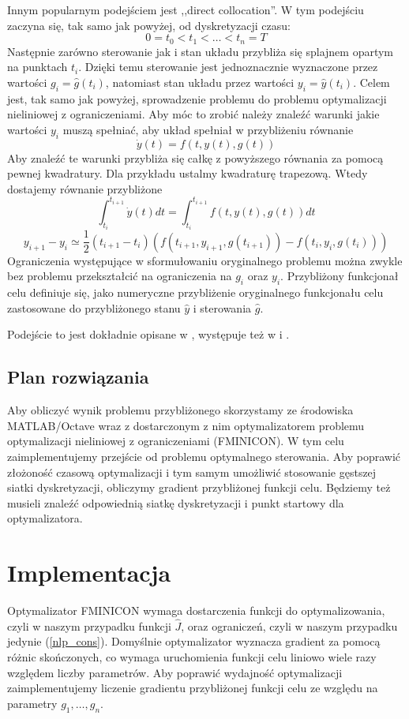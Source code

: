 \documentclass[11pt]{article}
\begin{document}
Innym popularnym podejściem jest ,,direct collocation''. W tym podejściu zaczyna się, tak samo jak powyżej, od dyskretyzacji czasu:
\[0 = t_0 < t_1 < \ldots < t_n = T\]
Następnie zarówno sterowanie jak i stan układu przybliża się splajnem opartym na punktach $t_i$. Dzięki temu sterowanie jest jednoznacznie wyznaczone przez wartości $g_i = \hat{g}(t_i)$, natomiast stan układu przez wartości $y_i = \hat{y}(t_i)$. Celem jest, tak samo jak powyżej, sprowadzenie problemu do problemu optymalizacji nieliniowej z ograniczeniami. Aby móc to zrobić należy znaleźć warunki jakie wartości $y_i$ muszą spełniać, aby układ spełniał w przybliżeniu równanie
\[\dot{y}(t) = f(t,y(t),g(t))\]
Aby znaleźć te warunki przybliża się całkę z powyższego równania za pomocą pewnej kwadratury. Dla przykładu ustalmy kwadraturę trapezową. Wtedy dostajemy równanie przybliżone
\[\int_{t_i}^{t_{i+1}} \dot{y}(t)dt = \int_{t_i}^{t_{i+1}} f(t,y(t),g(t))dt\]
\[y_{i+1} - y_{i} \simeq \frac{1}{2}(t_{i+1}-t_i)(f(t_{i+1}, y_{i+1}, g(t_{i+1})) - f(t_i, y_i, g(t_i)))\]
Ograniczenia występujące w sformułowaniu oryginalnego problemu można zwykle bez problemu przekształcić na ograniczenia na $g_i$ oraz $y_i$. Przybliżony funkcjonał celu definiuje się, jako numeryczne przybliżenie oryginalnego funkcjonału celu zastosowane do przybliżonego stanu $\hat{y}$ i sterowania $\hat{g}$.

Podejście to jest dokładnie opisane w \cite{Kelly}, występuje też w \cite{diehl} i \cite{rao-methods}.

\subsection{Plan rozwiązania}
Aby obliczyć wynik problemu przybliżonego skorzystamy ze środowiska MATLAB/Octave wraz z dostarczonym z nim optymalizatorem problemu optymalizacji nieliniowej z ograniczeniami (FMINICON). W tym celu zaimplementujemy przejście od problemu optymalnego sterowania. Aby poprawić złożoność czasową optymalizacji i tym samym umożliwić stosowanie gęstszej siatki dyskretyzacji, obliczymy gradient przybliżonej funkcji celu. Będziemy też musieli znaleźć odpowiednią siatkę dyskretyzacji i punkt startowy dla optymalizatora.

\section{Implementacja}
Optymalizator FMINICON wymaga dostarczenia funkcji do optymalizowania, czyli w naszym przypadku funkcji $\hat{J}$, oraz ograniczeń, czyli w naszym przypadku jedynie (\ref{nlp_cons}). Domyślnie optymalizator wyznacza gradient za pomocą różnic skończonych, co wymaga uruchomienia funkcji celu liniowo wiele razy względem liczby parametrów. Aby poprawić wydajność optymalizacji zaimplementujemy liczenie gradientu przybliżonej funkcji celu ze względu na parametry $g_1,\ldots, g_n$.
\end{document}
